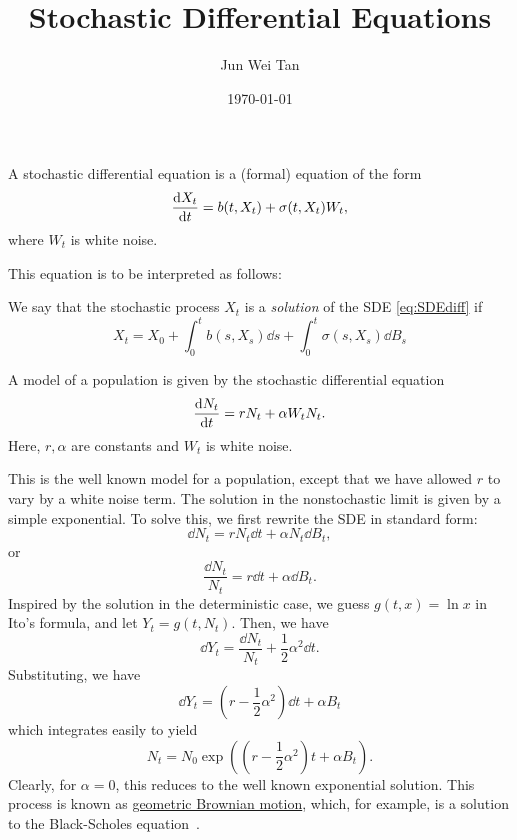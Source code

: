 \documentclass[prb,12pt]{revtex4-2}
\theoremstyle{definition}
\theoremstyle{definition}
\theoremstyle{definition}
\begin{document}
	\title{Stochastic Differential Equations}
	\author{Jun Wei Tan}
	\date{\today}
	\maketitle

\begin{Definition}
	A stochastic differential equation is a (formal) equation of the form
	\begin{equation}\label{eq:SDEdiff}
	\dv{X_t}{t}=b(t, X_t)+\sigma(t, X_t)W_t,
\end{equation}
	where $W_t$ is white noise. 
\end{Definition}
This equation is to be interpreted as follows:
\begin{Definition}
	We say that the stochastic process $X_t$ is a \emph{solution} of the SDE \eqref{eq:SDEdiff} if
	\[X_t = X_0+\int_0^t b(s, X_s)\dd{s}+ \int_0^t \sigma(s, X_s)\dd{B_s}\]
\end{Definition}
\begin{Example}
	A model of a population is given by the stochastic differential equation
	\[\dv{N_t}{t} = r N_t + \alpha W_t N_t.\]
	Here, $r,\alpha$ are constants and $W_t$ is white noise.
\end{Example}
This is the well known model for a population, except that we have allowed $r$ to vary by a white noise term. The solution in the nonstochastic limit is given by a simple exponential. To solve this, we first rewrite the SDE in standard form:
\[\dd{N_t}=r N_t\dd{t}+\alpha N_t \dd{B_t},\]
or
\[\frac{\dd{N_t}}{N_t} = r \dd{t} + \alpha \dd{B_t}.\]
Inspired by the solution in the deterministic case, we guess $g(t, x)=\ln x$ in Ito's formula, and let $Y_t=g(t, N_t)$. Then, we have
\[\dd{Y_t}=\frac{\dd{N_t}}{N_t}+\frac 12 \alpha^2 \dd{t}.\]
Substituting, we have
\[\dd{Y_t} = \left(r- \frac 12\alpha^2 \right)\dd{t} +\alpha B_t\]
which integrates easily to yield
\[N_t = N_0 \exp\left(\left(r - \frac 12 \alpha^2\right)t+\alpha B_t\right).\]
Clearly, for $\alpha=0$, this reduces to the well known exponential solution. This process is known as \uline{geometric Brownian motion}, which, for example, is a solution to the Black-Scholes equation~\cite{inbook}.
\end{document}
